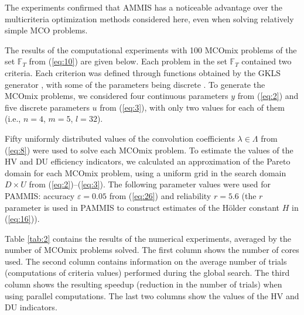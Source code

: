 \documentclass{svproc}
\begin{document}
The experiments confirmed that AMMIS has a noticeable advantage over the multicriteria optimization methods considered here, even when solving relatively simple MCO problems.

The results of the computational experiments with 100 MCOmix problems of the set $\mathbb{F}_T$ from (\ref{eq:10}) are given below. Each problem in the set $\mathbb{F}_T$ contained two criteria. Each criterion was defined through functions obtained by the GKLS generator \cite{c44}, with some of the parameters being discrete \cite{c45}. To generate the MCOmix problems, we considered four continuous parameters $y$ from (\ref{eq:2}) and five discrete parameters $u$ from (\ref{eq:3}), with only two values for each of them (i.e., $n=4$, $m=5$, $l=32$).

Fifty uniformly distributed values of the convolution coefficients $\lambda \in \Lambda$ from (\ref{eq:8}) were used to solve each MCOmix problem. To estimate the values of the HV and DU efficiency indicators, we calculated an approximation of the Pareto domain for each MCOmix problem, using a uniform grid in the search domain $D\times U$ from (\ref{eq:2})--(\ref{eq:3}). The following parameter values were used for PAMMIS: accuracy $\varepsilon=0.05$ from (\ref{eq:26}) and reliability $r=5.6$ (the $r$ parameter is used in PAMMIS to construct estimates of the H{\"o}lder constant $H$ in (\ref{eq:16})).

Table \ref{tab:2} contains the results of the numerical experiments, averaged by the number of MCOmix problems solved. The first column shows the number of cores used. The second column contains information on the average number of trials (computations of criteria values) performed during the global search. The third column shows the resulting speedup (reduction in the number of trials) when using parallel computations. The last two columns show the values of the HV and DU indicators.
\end{document}
